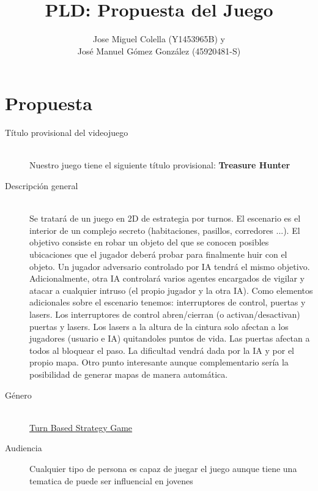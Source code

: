 \documentclass[a4paper]{article}
\title{PLD: Propuesta del Juego}
\author{Jose Miguel Colella (Y1453965B) y\\José Manuel Gómez González (45920481-S)}
\begin{document}
\maketitle

\section{Propuesta}

\begin{description}
  \item[Título provisional del videojuego] \hfill \\
  Nuestro juego tiene el siguiente título provisional: \textbf{Treasure Hunter}
  \item[Descripción general] \hfill \\
   Se tratará de un juego en 2D de estrategia por turnos. El
escenario es el interior de un complejo secreto (habitaciones, pasillos,
corredores ...). El objetivo consiste en robar un objeto del que se
conocen posibles ubicaciones que el jugador deberá probar para
finalmente huir con el objeto. Un jugador adversario controlado por IA
tendrá el mismo objetivo. Adicionalmente, otra IA controlará varios
agentes encargados de vigilar y atacar a cualquier intruso (el propio
jugador y la otra IA). Como elementos adicionales sobre el escenario
tenemos: interruptores de control, puertas y lasers. Los interruptores
de control abren/cierran (o activan/desactivan) puertas y lasers. Los
lasers a la altura de la cintura solo afectan a los jugadores (usuario e
IA) quitandoles puntos de vida. Las puertas afectan a todos al bloquear
el paso. La dificultad vendrá dada por la IA y por el propio mapa.
Otro punto interesante aunque complementario sería la
posibilidad de generar mapas de manera automática.
  \item[Género] \hfill \\
  \href{http://en.wikipedia.org/wiki/Video_game_genre#Turn-based_strategy}{Turn Based Strategy Game}
  \item[Audiencia]
  Cualquier tipo de persona es capaz de juegar el juego aunque tiene una tematica de puede
  ser influencial en jovenes


\end{description}
\end{document}
